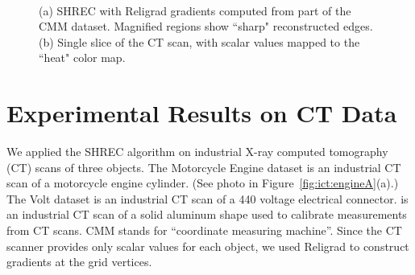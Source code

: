\begin{figure}[t]
	\centering
	\\
	\caption{(a) SHREC with Religrad gradients computed from part of the CMM dataset. Magnified regions show ``sharp" reconstructed edges. (b) Single slice of the CT scan, with scalar values mapped to the ``heat" color map.}\label{fig:ict:CMM}
\end{figure}

\section{Experimental Results on CT Data}

We applied the SHREC algorithm on industrial X-ray computed tomography (CT)
scans of three objects.
The Motorcycle Engine dataset is an industrial CT scan 
of a motorcycle engine cylinder.
(See photo in Figure~\ref{fig:ict:engineA}(a).)
The Volt dataset is an industrial CT scan 
of a 440 voltage electrical connector.
is an industrial CT scan of a solid aluminum shape
used to calibrate measurements from CT scans.
CMM stands for ``coordinate measuring machine''.
Since the CT scanner provides only scalar values for each object,
we used Religrad to construct gradients at the grid vertices.

